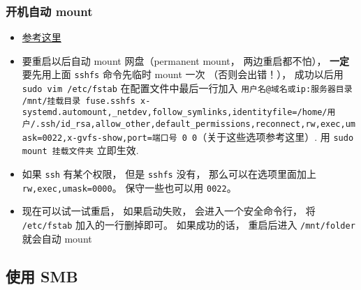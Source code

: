 \subsubsection{开机自动 mount}
\begin{itemize}
\item \href{https://www.linode.com/docs/networking/ssh/using-sshfs-on-linux/}{参考这里}
\item 要重启以后自动 mount 网盘（permanent mount， 两边重启都不怕）， \textbf{一定}要先用上面 \verb`sshfs` 命令先临时 mount 一次 （否则会出错！）， 成功以后用 \verb`sudo vim /etc/fstab` 在配置文件中最后一行加入 \verb`用户名@域名或ip:服务器目录 /mnt/挂载目录 fuse.sshfs x-systemd.automount,_netdev,follow_symlinks,identityfile=/home/用户/.ssh/id_rsa,allow_other,default_permissions,reconnect,rw,exec,umask=0022,x-gvfs-show,port=端口号 0 0`（关于这些选项参考这里）. 用 \verb`sudo mount 挂载文件夹` 立即生效.
\item 如果 \verb|ssh| 有某个权限， 但是 \verb|sshfs| 没有， 那么可以在选项里面加上 \verb|rw,exec,umask=0000|。 保守一些也可以用 \verb|0022|。
\item 现在可以试一试重启， 如果启动失败， 会进入一个安全命令行， 将 \verb`/etc/fstab` 加入的一行删掉即可。 如果成功的话， 重启后进入 \verb`/mnt/folder` 就会自动 mount
\end{itemize}

\subsection{使用 SMB}
